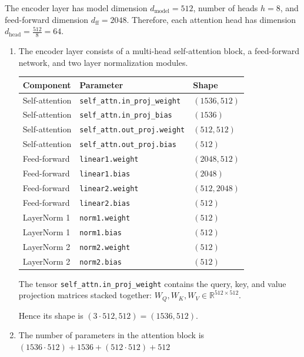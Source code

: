\begin{solution}

The encoder layer has model dimension $d_{\text{model}}=512$, number of heads $h=8$, and feed-forward dimension $d_{\text{ff}}=2048$. Therefore, each attention head has dimension
$
d_{\text{head}} = \frac{512}{8} = 64.
$

\begin{enumerate}
    \item The encoder layer consists of a multi-head self-attention block, a feed-forward network, and two layer normalization modules.

    \begin{center}
    \begin{tabular}{lll}
    \hline
    Component & Parameter & Shape \\
    \hline
    Self-attention & \texttt{self\_attn.in\_proj\_weight} & $(1536,512)$ \\
    Self-attention & \texttt{self\_attn.in\_proj\_bias} & $(1536)$ \\
    Self-attention & \texttt{self\_attn.out\_proj.weight} & $(512,512)$ \\
    Self-attention & \texttt{self\_attn.out\_proj.bias} & $(512)$ \\
    Feed-forward & \texttt{linear1.weight} & $(2048,512)$ \\
    Feed-forward & \texttt{linear1.bias} & $(2048)$ \\
    Feed-forward & \texttt{linear2.weight} & $(512,2048)$ \\
    Feed-forward & \texttt{linear2.bias} & $(512)$ \\
    LayerNorm 1 & \texttt{norm1.weight} & $(512)$ \\
    LayerNorm 1 & \texttt{norm1.bias} & $(512)$ \\
    LayerNorm 2 & \texttt{norm2.weight} & $(512)$ \\
    LayerNorm 2 & \texttt{norm2.bias} & $(512)$ \\
    \hline
    \end{tabular}
    \end{center}

    The tensor \texttt{self\_attn.in\_proj\_weight} contains the query, key, and value projection matrices stacked together:
    $
    W_Q, W_K, W_V \in \mathbb{R}^{512 \times 512}.
    $

    Hence its shape is
    $
    (3 \cdot 512, 512) = (1536,512).
    $

    \item The number of parameters in the attention block is
    $
    (1536 \cdot 512) + 1536 + (512 \cdot 512) + 512
    $


\end{enumerate}
\end{solution}
